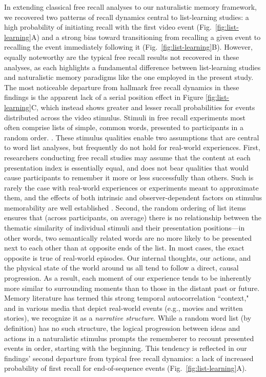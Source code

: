 \documentclass{article}
\begin{document}
In extending classical free recall analyses to our naturalistic memory framework, we recovered two patterns of recall dynamics central to list-learning studies: a high probability of initiating recall with the first video event (Fig.~\ref{fig:list-learning}A) and a strong bias toward transitioning from recalling a given event to recalling the event immediately following it (Fig.~\ref{fig:list-learning}B).  However, equally noteworthy are the typical free recall results not recovered in these analyses, as each highlights a fundamental difference between list-learning studies and naturalistic memory paradigms like the one employed in the present study.  The most noticeable departure from hallmark free recall dynamics in these findings is the apparent lack of a serial position effect in Figure \ref{fig:list-learning}C, which instead shows greater and lesser recall probabilities for events distributed across the video stimulus.  Stimuli in free recall experiments most often comprise lists of simple, common words, presented to participants in a random order. \citep[In fact, numerous word pools have been developed based on these criteria; e.g.,][]{FrieEtal82}.  These stimulus qualities enable two assumptions that are central to word list analyses, but frequently do not hold for real-world experiences.  First, researchers conducting free recall studies may assume that the content at each presentation index is essentially equal, and does not bear qualities that would cause participants to remember it more or less successfully than others.  Such is rarely the case with real-world experiences or experiments meant to approximate them, and the effects of both intrinsic and observer-dependent factors on stimulus memorability are well established \citep[for review see][]{ChunTurk07, ByliEtal15, TyngEtal17}.  Second, the random ordering of list items ensures that (across participants, on average) there is no relationship between the thematic similarity of individual stimuli and their presentation positions---in other words, two semantically related words are no more likely to be presented next to each other than at opposite ends of the list.  In most cases, the exact opposite is true of real-world episodes.  Our internal thoughts, our actions, and the physical state of the world around us all tend to follow a direct, causal progression.  As a result, each moment of our experience tends to be inherently more similar to surrounding moments than to those in the distant past or future.  Memory literature has termed this strong temporal autocorrelation ``context," and in various media that depict real-world events (e.g., movies and written stories), we recognize it as a \textit{narrative structure}.  While a random word list (by definition) has no such structure, the logical progression between ideas and actions in a naturalistic stimulus prompts the rememberer to recount presented events in order, starting with the beginning.  This tendency is reflected in our findings' second departure from typical free recall dynamics: a lack of increased probability of first recall for end-of-sequence events (Fig.~\ref{fig:list-learning}A).
\end{document}
